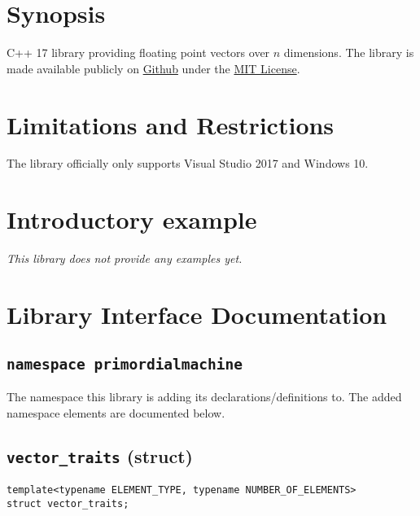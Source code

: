 \documentclass[oneside]{book}
\begin{document}
\frontmatter

\begin{titlepage}
\maketitle
\end{titlepage}

\tableofcontents
{}

\mainmatter

\chapter{Synopsis}
C++ 17 library providing floating point vectors over $n$ dimensions.
The library is made available publicly on
\href{\GetLibraryRepository}{Github}
under the
\href{\GetLibraryRepository/blob/master/LICENSE}{MIT License}.

\chapter{Limitations and Restrictions}
The library officially only supports Visual Studio 2017 and Windows 10.

\chapter{Introductory example}
\textit{\color{orange}This library does not provide any examples yet.}



\chapter{Library Interface Documentation}

\section{\texttt{namespace primordialmachine}}
The namespace this library is adding its declarations/definitions to.
The added namespace elements are documented below.



\section{\texttt{vector\_traits} (struct)}
\begin{verbatim}
template<typename ELEMENT_TYPE, typename NUMBER_OF_ELEMENTS>
struct vector_traits;
\end{verbatim}
\end{document}
